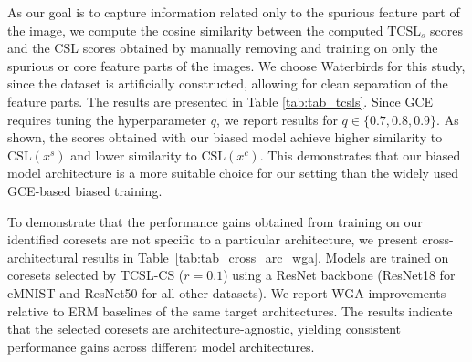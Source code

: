 \documentclass[letter,11pt]{article}
\begin{document}
As our goal is to capture information related only to the spurious feature part of the image, we compute the cosine similarity between the computed $\text{TCSL}_s$ scores and the CSL scores obtained by manually removing and training on only the spurious or core feature parts of the images. We choose Waterbirds for this study, since the dataset is artificially constructed, allowing for clean separation of the feature parts. The results are presented in Table \ref{tab:tab_tcsls}.
Since GCE requires tuning the hyperparameter $q$, we report results for $q \in \{0.7, 0.8, 0.9\}$. As shown, the scores obtained with our biased model achieve higher similarity to $\text{CSL}(x^s)$ and lower similarity to $\text{CSL}(x^c)$. This demonstrates that our biased model architecture is a more suitable choice for our setting than the widely used GCE-based biased training.

To demonstrate that the performance gains obtained from training on our identified coresets are not specific to a particular architecture, we present cross-architectural results in Table~\ref{tab:tab_cross_arc_wga}. Models are trained on coresets selected by TCSL-CS ($r=0.1$) using a ResNet backbone (ResNet18 for cMNIST and ResNet50 for all other datasets). We report WGA improvements relative to ERM baselines of the same target architectures. The results indicate that the selected coresets are architecture-agnostic, yielding consistent performance gains across different model architectures.
\end{document}
